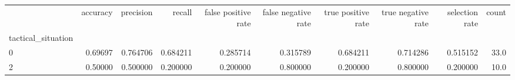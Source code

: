 \begin{tabular}{lrrrrrrrrr}
\toprule
{} &  accuracy &  precision &    recall &  false positive rate &  false negative rate &  true positive rate &  true negative rate &  selection rate &  count \\
tactical\_situation &           &            &           &                      &                      &                     &                     &                 &        \\
\midrule
0                  &   0.69697 &   0.764706 &  0.684211 &             0.285714 &             0.315789 &            0.684211 &            0.714286 &        0.515152 &   33.0 \\
2                  &   0.50000 &   0.500000 &  0.200000 &             0.200000 &             0.800000 &            0.200000 &            0.800000 &        0.200000 &   10.0 \\
\bottomrule
\end{tabular}
